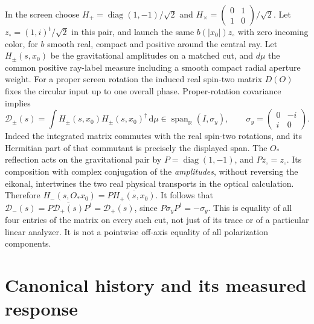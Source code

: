 \documentclass[11pt]{article}
\newcommand{\dd}{\mathrm d}
\begin{document}
In the screen choose
\(H_+=\operatorname{diag}(1,-1)/\sqrt2\) and
\(H_\times=(\begin{smallmatrix}0&1\\1&0\end{smallmatrix})/\sqrt2\).
Let \(z_\circ=(1,i)^t/\sqrt2\) in this pair, and launch
the same \(b(|x_0|)z_\circ\) with zero incoming color,
for \(b\) smooth real, compact and positive around the
central ray. Let \(H_\pm(s,x_0)\) be the gravitational
amplitudes on a matched cut, and \(d\mu\) the common
positive ray-label measure including a smooth compact
radial aperture weight. For a proper screen rotation
the induced real spin-two matrix \(D(O)\) fixes the
circular input up to one overall phase. Proper-rotation
covariance implies
\[
 \mathcal D_\pm(s)
   =\int H_\pm(s,x_0)H_\pm(s,x_0)^\dagger\,\dd\mu
                 \in\operatorname{span}_{\mathbb R}(I,\sigma_y),
 \qquad \sigma_y=\begin{pmatrix}0&-i\\i&0\end{pmatrix}.
\]
Indeed the integrated matrix commutes with the real
spin-two rotations, and its Hermitian part of that
commutant is precisely the displayed span. The
\(O_*\) reflection acts on the gravitational pair
by \(P=\operatorname{diag}(1,-1)\), and
\(P\overline{z_\circ}=z_\circ\). Its composition with
complex conjugation of the \emph{amplitudes}, without
reversing the eikonal, intertwines the two real physical
transports in the optical calculation. Therefore
\(H_-(s,O_*x_0)=P\overline{H_+(s,x_0)}\).
It follows that
\(\mathcal D_-(s)=P\overline{\mathcal D_+(s)}P^t
=\mathcal D_+(s)\), since \(P\sigma_yP^t=-\sigma_y\).
This is equality of all four entries of the matrix
on every such cut, not just of its trace or of a
particular linear analyzer. It is not a pointwise
off-axis equality of all polarization components.

\section{Canonical history and its measured response}\label{sec:bracket}
\end{document}

